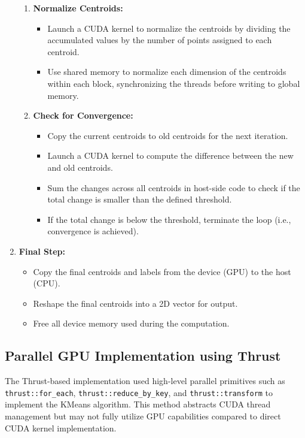 \documentclass[letterpaper,12pt]{article}
\theoremstyle{remark}
\begin{document}
\begin{enumerate}
\begin{enumerate}
        \item \textbf{Normalize Centroids:}
        \begin{itemize}
            \item Launch a CUDA kernel to normalize the centroids by dividing the accumulated values by the number of points assigned to each centroid.
            \item Use shared memory to normalize each dimension of the centroids within each block, synchronizing the threads before writing to global memory.
        \end{itemize}

        \item \textbf{Check for Convergence:}
        \begin{itemize}
            \item Copy the current centroids to old centroids for the next iteration.
            \item Launch a CUDA kernel to compute the difference between the new and old centroids.
            \item Sum the changes across all centroids in host-side code to check if the total change is smaller than the defined threshold.
            \item If the total change is below the threshold, terminate the loop (i.e., convergence is achieved).
        \end{itemize}
    \end{enumerate}
    
    \item \textbf{Final Step:}
    \begin{itemize}
        \item Copy the final centroids and labels from the device (GPU) to the host (CPU).
        \item Reshape the final centroids into a 2D vector for output.
        \item Free all device memory used during the computation.
    \end{itemize}
\end{enumerate}









\subsection{Parallel GPU Implementation using Thrust}
The Thrust-based implementation used high-level parallel primitives such as \texttt{thrust::for\_each}, \texttt{thrust::reduce\_by\_key}, and \texttt{thrust::transform} to implement the KMeans algorithm. This method abstracts CUDA thread management but may not fully utilize GPU capabilities compared to direct CUDA kernel implementation.
\end{document}
